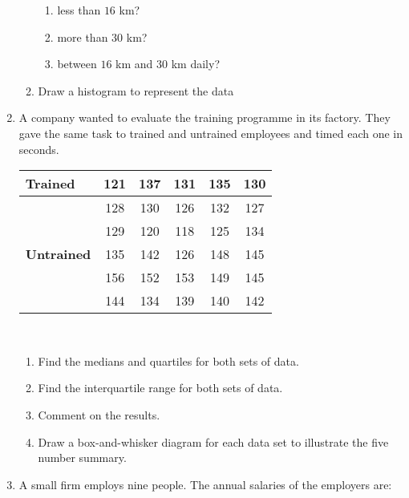 \begin{eocexercises}{}
\begin{enumerate}[itemsep=6pt, label=\textbf{\arabic*}.]
\begin{enumerate}[noitemsep, label=\textbf{(\alph*)} ]
      \begin{enumerate}[noitemsep, label=\textbf{\roman*}. ]
      \item less than $16$ km?
      \item more than $30$ km?
      \item between $16$ km and $30$ km daily?
      \end{enumerate}
\item Draw a histogram to represent the data
    \end{enumerate}
  \item A company wanted to evaluate the training programme in its
    factory. They gave the same task to trained and untrained
    employees and timed each one in seconds.
\\
    \begin{center}
      \begin{tabular}{|l|c|c|c|c|c|} \hline
        \textbf{Trained} & 121 & 137 & 131 & 135 & 130 \\ \hline
                         & 128 & 130 & 126 & 132 & 127 \\\hline
                         & 129 & 120 & 118 & 125 & 134 \\\hline
        \textbf{Untrained} & 135 & 142 & 126 & 148 & 145 \\\hline
                           & 156 & 152 & 153 & 149 & 145 \\\hline
                           & 144 & 134 & 139 & 140 & 142 \\\hline
      \end{tabular}
    \end{center}
\vspace {8pt}\\
    \begin{enumerate}[noitemsep, label=\textbf{(\alph*)} ]
    \item Find the medians and quartiles for both sets of data.
    \item Find the interquartile range for both sets of data.
    \item Comment on the results.
    \item Draw a box-and-whisker diagram for each data set to illustrate the five number summary.
    \end{enumerate}
  \item A small firm employs nine people. The annual salaries of the employers are:
\\
    \begin{center}
      \begin{tabular}{|r|r|r|} \hline

\end{tabular}
\end{center}
\end{enumerate}
\end{eocexercises}
